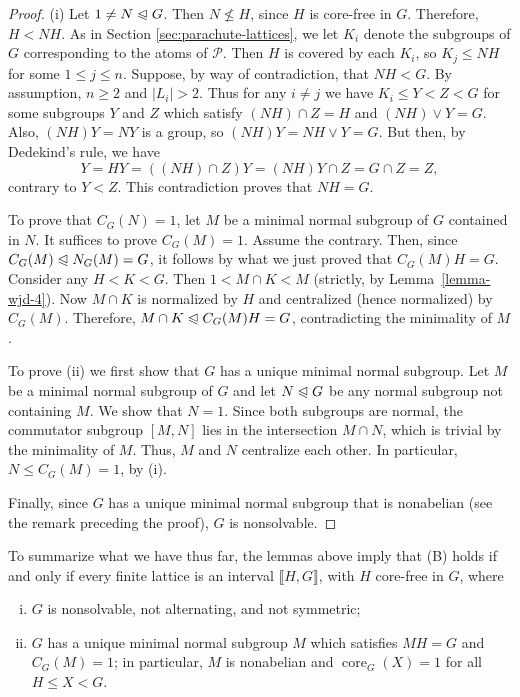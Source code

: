 \documentclass{gen-j-l}
\newcommand{\lb}{\ensuremath{\llbracket}}
\newcommand{\rb}{\ensuremath{\rrbracket}}
\newcommand{\<}{\ensuremath{\langle}}
\renewcommand{\>}{\ensuremath{\rangle}}
\theoremstyle{plain}
\theoremstyle{definition}
\theoremstyle{remark}
\numberwithin{theorem}{section}
\numberwithin{claim}{section}
\numberwithin{equation}{section}
\numberwithin{conjecture}{section}
\renewcommand{\leq}{\ensuremath{\leqslant}}
\renewcommand{\nleq}{\ensuremath{\nleqslant}}
\renewcommand{\geq}{\ensuremath{\geqslant}}
\newcommand{\subnormal}{\ensuremath{\trianglelefteqslant}}
\newcommand{\join}{\ensuremath{\vee}}
\newcommand{\core}{\ensuremath{\operatorname{core}}}
\newcommand{\2}{\ensuremath{\mathbf{2}}}
\newcommand{\3}{\ensuremath{\mathbf{3}}}
\newcommand{\sP}{\ensuremath{\mathscr{P}}}
\begin{document}
\begin{proof}
(i)
Let $1\neq N \subnormal G$.  Then $N \nleq H$, since $H$ is core-free in $G$.
Therefore, $H < NH$.   As in Section \ref{sec:parachute-lattices}, we let $K_i$
denote the subgroups of $G$ 
corresponding to the atoms of $\sP$.  
Then $H$ is covered by each $K_i$, so $K_j\leq NH$ for some $1\leq j\leq n$.  
Suppose, by way of contradiction, that $NH < G$.  
By assumption, $n\geq 2$ and $|L_i|>2$.  Thus for any $i\neq j$ we have
$K_i\leq Y < Z < G$ for some subgroups $Y$ and $Z$ which satisfy
$(NH)\cap Z = H$ and $(NH)\join Y = G$.  Also, $(NH)Y = NY$ is a group, so
$(NH)Y=NH\join Y = G$.  But then, by Dedekind's rule, we have
\[
Y = HY = ((NH)\cap Z) Y = (NH)Y \cap Z = G\cap Z = Z,
\]
contrary to $Y<Z$.  This contradiction proves that $NH = G$.

To prove that $C_G(N)=1$, let $M$ be a minimal normal subgroup of $G$
contained in $N$.  It suffices to prove $C_G(M)= 1$.
Assume the contrary. Then, 
since $C_G(M) \subnormal N_G(M) =G$, it follows by
what we just proved that $C_G(M)H = G$.
Consider any $H< K < G$. Then $1 < M\cap K < M$ (strictly, by
Lemma~\ref{lemma-wjd-4}). Now $M\cap K$ is normalized by $H$ and centralized
(hence normalized) by $C_G(M)$.  
Therefore, $M\cap K \subnormal C_G(M)H = G$, contradicting the minimality of
$M$.  

To prove (ii) we first show that $G$ has a unique minimal normal subgroup.  Let
$M$ be a minimal
normal subgroup of $G$ and let $N \subnormal G$ be any normal subgroup not 
containing $M$.  We show that $N = 1$.  Since both subgroups
are normal, the commutator subgroup
$[M,N]$
lies in the intersection $M\cap N$, which is trivial by the minimality of $M$.   
Thus, $M$ and $N$ centralize each other.  In particular,
$N \leq C_G(M) = 1$, by (i).

Finally, since $G$ has a unique
minimal normal subgroup that is nonabelian 
(see the remark preceding the proof),
$G$ is nonsolvable.
\end{proof}

To summarize what we have thus far, the lemmas above imply that (B) holds if and only if
every finite lattice is an interval $\lb H, G \rb$, with $H$ core-free in $G$, where
\begin{enumerate}[(i)]
\item $G$ is nonsolvable, not alternating, and not symmetric;
\item $G$ has a unique minimal normal subgroup $M$ which satisfies $MH = G$
and $C_G(M) = 1$; in particular,
$M$ is nonabelian and $\core_G(X) = 1$ for all $H\leq X < G$.
\end{enumerate}
\end{document}
